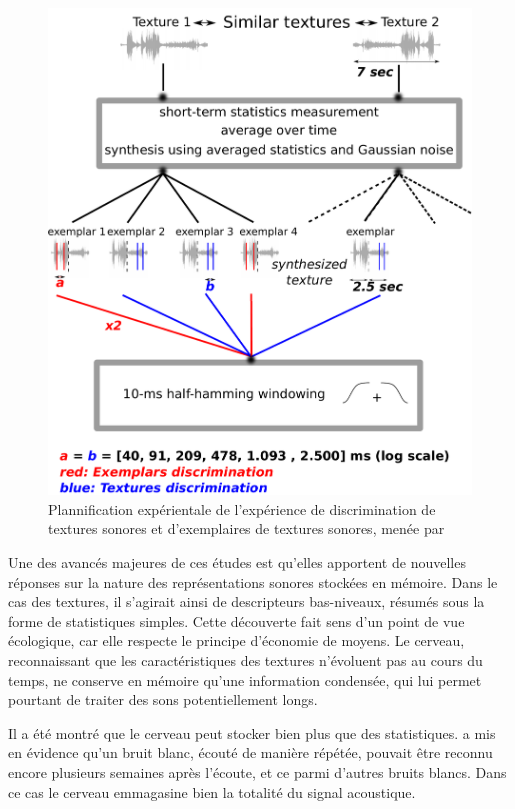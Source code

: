 \begin{figure}[t]
        \myfloatalign
        \includegraphics[width=.8\linewidth]{gfx/mcder}
        \caption[Plannification expérientale de l'expérience de discrimination de textures sonores et d'exemplaires de textures sonores]{Plannification expérientale de l'expérience de discrimination de textures sonores et d'exemplaires de textures sonores, menée par \citep{mcdermott2013summary}}\label{fig:textureMcder}
\end{figure}

Une des avancés majeures de ces études est qu'elles apportent de nouvelles réponses sur la nature des représentations sonores stockées en mémoire. Dans le cas des textures, il s'agirait ainsi de descripteurs bas-niveaux, résumés sous la forme de statistiques simples. Cette découverte fait sens d'un point de vue écologique, car elle respecte le principe d'économie de moyens. Le cerveau, reconnaissant que les caractéristiques des textures n'évoluent pas au cours du temps, ne conserve en mémoire qu'une information condensée, qui lui permet pourtant de traiter des sons potentiellement longs. 

Il a été montré que le cerveau peut stocker bien plus que des statistiques. \citep{agus2010rapid} a mis en évidence qu'un bruit blanc, écouté de manière répétée, pouvait être reconnu encore plusieurs semaines après l'écoute, et ce parmi d'autres bruits blancs. Dans ce cas le cerveau emmagasine bien la totalité du signal acoustique.

